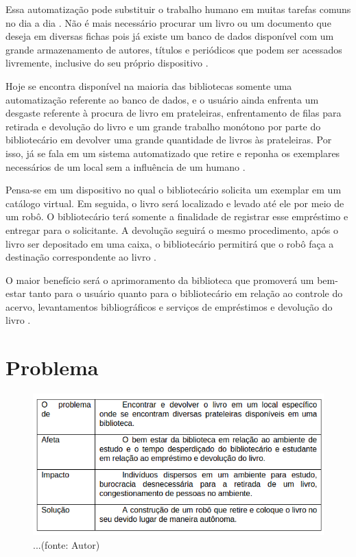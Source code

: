 Essa automatização pode substituir o trabalho humano em muitas tarefas comuns no dia a dia \cite{fraga2011}. Não é mais necessário procurar um livro ou um documento que deseja em diversas fichas pois já existe um banco de dados disponível com um grande armazenamento de autores, títulos e periódicos que podem ser acessados livremente, inclusive do seu próprio dispositivo \cite{santana2015}.

Hoje se encontra disponível na maioria das bibliotecas somente uma automatização referente ao banco de dados\cite{santana2015}, e o usuário ainda enfrenta um desgaste referente à procura de livro em prateleiras, enfrentamento de filas para retirada e devolução do livro e um grande trabalho monótono por parte do bibliotecário em devolver uma grande quantidade de livros às prateleiras. Por isso, já se fala em um sistema automatizado que retire e reponha os exemplares necessários de um local sem a influência de um humano \cite{fraga2011}. 

Pensa-se em um dispositivo no qual o bibliotecário solicita um exemplar em um catálogo virtual. Em seguida, o livro será localizado e levado até ele por meio de um robô. O bibliotecário terá somente a finalidade de registrar esse empréstimo e entregar para o solicitante.  A devolução seguirá o mesmo procedimento, após o livro ser depositado em uma caixa, o bibliotecário permitirá que o robô faça a destinação correspondente ao livro \cite{fraga2011}.

O maior benefício será o aprimoramento da biblioteca que promoverá um bem-estar tanto para o usuário quanto para o bibliotecário em relação ao controle do acervo, levantamentos bibliográficos e serviços de empréstimos e devolução do livro \cite{fraga2011}. 

\section{Problema}

\begin{figure}[!h]
\centering
\includegraphics[scale=1, angle = 360]{figuras/tabela_1}
\caption[]{...(fonte: Autor)}
\end{figure}
\FloatBarrier

